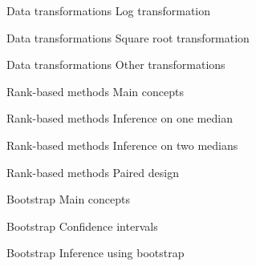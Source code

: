 \documentclass[t]{beamer}
\begin{document}

\begin{ftst}
{Data transformations}
{Log transformation}

\end{ftst}


\begin{ftst}
{Data transformations}
{Square root transformation}

\end{ftst}


\begin{ftst}
{Data transformations}
{Other transformations}

\end{ftst}

\begin{ftst}
{Rank-based methods}
{Main concepts}

\end{ftst}


\begin{ftst}
{Rank-based methods}
{Inference on one median}

\end{ftst}


\begin{ftst}
{Rank-based methods}
{Inference on two medians}

\end{ftst}


\begin{ftst}
{Rank-based methods}
{Paired design}

\end{ftst}

\begin{ftst}
{Bootstrap}
{Main concepts}

\end{ftst}


\begin{ftst}
{Bootstrap}
{Confidence intervals}

\end{ftst}


\begin{ftst}
{Bootstrap}
{Inference using bootstrap}

\end{ftst}
\end{document}
